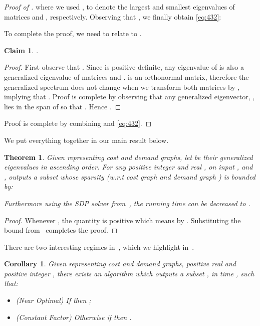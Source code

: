 \documentclass{article}
\newtheorem{theorem}{Theorem}[section]
\newtheorem{corollary}{Corollary}[section]
\newtheorem{claim}{Claim}[section]
\newcounter{alg-count}
\newcommand{\vnote}[1]{}
\newcommand{\aknote}[1]{}
\begin{document}
\begin{proof}[Proof of ]
where we used ,  to denote the 
largest and smallest eigenvalues of matrices  and ,
respectively.  Observing that , we
finally obtain \cref{eq:432}:

To complete the proof, we need to relate  to .
\begin{claim} \label{clm:50910112}
.
\end{claim}
\begin{proof} First observe that . Since  is positive definite, any
  eigenvalue of  is also a
  generalized eigenvalue of matrices  and .  is
  an orthonormal matrix, therefore the generalized spectrum does not
  change when we transform both matrices by , implying that
  . Proof is complete
  by observing that any generalized eigenvector, , lies in the span
  of  so that . Hence .
\end{proof}
Proof is complete by combining  and \cref{eq:432}.
\end{proof}
We put everything together in our main result below.
\begin{theorem}
\label{cor:final-bnd}
Given  representing cost and demand
graphs, let 
be their generalized eigenvalues in ascending order.
For any positive integer  and real , on input ,  and
,  outputs a
subset  whose sparsity  (w.r.t cost graph  and
demand graph ) is bounded by:

Furthermore using the SDP solver from~\cite{gs12-fast}, the running
time can be decreased to .  \vnote{Where does the
  ``provided" constraint come from? It is not transparent from the
  proof.}  \aknote{Necessary otherwise the quantity is negative, which
  means the upper bound becomes lower bound when we take the
  reciprocal.}
\end{theorem}
\begin{proof} Whenever ,
  the quantity  is
  positive which means
 by . Substituting the bound
from~ completes the proof.
\end{proof}
There are two interesting regimes in~, which we
highlight in~.
\begin{corollary}
\label{cor:final-bnd-regimes}
Given  representing cost and demand
graphs, positive real  and positive integer
, there exists an algorithm which outputs a subset , in
time , such that:
\begin{itemize}
\item (Near Optimal) If  then ;
\item (Constant Factor) Otherwise if  then .
\end{itemize}
\end{corollary}
\end{document}
